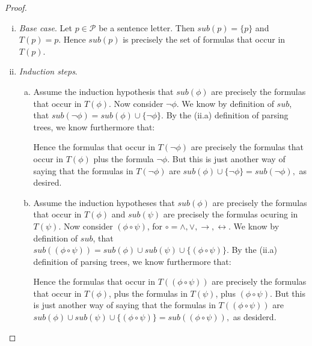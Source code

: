 \begin{enumerate}[\thesection.1]
\begin{proof}
		\begin{enumerate}[(i)]
		
			\item \emph{Base case}. Let $p\in\mathcal{P}$ be a sentence letter. Then $sub(p)=\{p\}$ and $T(p)=p$. Hence $sub(p)$ is precisely the set of formulas that occur in $T(p)$.
			
			\item \emph{Induction steps}. 
				\begin{enumerate}[(a)]

					\item Assume the induction hypothesis that $sub(\phi)$ are precisely the formulas that occur in $T(\phi)$. Now consider $\neg \phi$. We know by definition of $sub$, that $sub(\neg\phi)=sub(\phi)\cup\{\neg\phi\}$. By the (ii.a) definition of parsing trees, we know furthermore that:
					\begin{center}
\end{center}
Hence the formulas that occur in $T(\neg\phi)$ are precisely the formulas that occur in $T(\phi)$ plus the formula $\neg\phi$. But this is just another way of saying that the formulas in $T(\neg\phi)$ are  $sub(\phi)\cup\{\neg\phi\}=sub(\neg\phi),$ as desired.

			\item Assume the induction hypotheses that $sub(\phi)$ are precisely the formulas that occur in $T(\phi)$ and $sub(\psi)$ are precisely the formulas ocuring in $T(\psi)$. Now consider $(\phi\circ\psi)$, for $\circ=\land,\lor,\to,\leftrightarrow$. We know by definition of $sub$, that $sub((\phi\circ\psi))=sub(\phi)\cup sub(\psi)\cup\{(\phi\circ\psi)\}$. By the (ii.a) definition of parsing trees, we know furthermore that:
					\begin{center}
\end{center}
Hence the formulas that occur in $T((\phi\circ\psi))$ are precisely the formulas that occur in $T(\phi)$, plus the formulas in $T(\psi)$, plus $(\phi\circ\psi)$. But this is just another way of saying that the formulas in $T((\phi\circ\psi))$ are $sub(\phi)\cup sub(\psi)\cup\{(\phi\circ\psi)\}=sub((\phi\circ\psi)),$ as desiderd.


\end{enumerate}
\end{enumerate}
\end{proof}
\end{enumerate}
